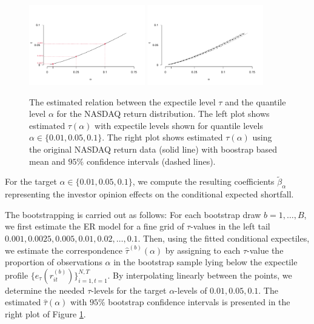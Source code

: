 \documentclass[11pt]{article}
\begin{document}
\begin{figure}\label{fig:figure4}
\centering
\includegraphics[width=0.45\textwidth]{sentiment_analysis_files/figure-latex/figure4-1}
\includegraphics[width=0.45\textwidth]{sentiment_analysis_files/figure-latex/figure5-1}
\caption{The estimated relation between the expectile level \(\tau\) and the quantile level \(\alpha\) for the NASDAQ return distribution. The left plot shows  estimated $\tau(\alpha)$ with expectile levels shown for quantile levels \(\alpha\in\{0.01,0.05,0.1\}\). The right plot shows estimated $\tau(\alpha)$ using the original NASDAQ return data (solid line) with boostrap based mean and $95\%$ confidence intervals (dashed lines).}\vspace{-0.5cm}
\end{figure}


For the target \(\alpha\in\{0.01,0.05,0.1\}\), we compute the resulting coefficients \(\tilde\beta_\alpha\) representing the investor opinion effects on the conditional expected shortfall.

The bootstrapping is carried out as follows: For each bootstrap draw \(b=1,\ldots, B\), we first estimate the ER model for a fine grid of \(\tau\)-values in the left tail \(0.001,0.0025,0.005,0.01,0.02,\ldots,0.1\). Then, using the fitted conditional expectiles, we estimate the correspondence \(\hat\tau^{(b)}(\alpha)\) by assigning to each \(\tau\)-value the proportion of observations \(\alpha\) in the bootstrap sample lying below the expectile profile \(\{e_{\tau}(r^{(b)}_{it})\}_{i=1,t=1}^{N,T}\). By interpolating linearly between the points, we determine the needed \(\tau\)-levels for the target \(\alpha\)-levels of \(0.01,0.05,0.1\). The estimated \(\hat\tau(\alpha)\) with \(95\%\) bootstrap confidence intervals is presented in the right plot of Figure \ref{fig:figure4}.
\end{document}
